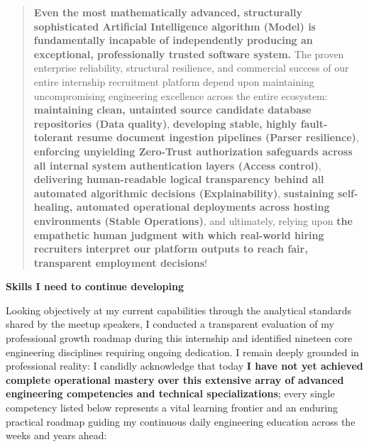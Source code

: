 \begin{quote}
\textbf{Even the most mathematically advanced, structurally
sophisticated Artificial Intelligence algorithm (Model) is fundamentally
incapable of independently producing an exceptional, professionally
trusted software system.} The proven enterprise reliability, structural
resilience, and commercial success of our entire internship recruitment
platform depend upon maintaining uncompromising engineering excellence
across the entire ecosystem: \textbf{maintaining clean, untainted source
candidate database repositories (Data quality)}, \textbf{developing
stable, highly fault-tolerant resume document ingestion pipelines
(Parser resilience)}, \textbf{enforcing unyielding Zero-Trust
authorization safeguards across all internal system authentication
layers (Access control)}, \textbf{delivering human-readable logical
transparency behind all automated algorithmic decisions
(Explainability)}, \textbf{sustaining self-healing, automated
operational deployments across hosting environments (Stable
Operations)}, and ultimately, relying upon \textbf{the empathetic human
judgment with which real-world hiring recruiters interpret our platform
outputs to reach fair, transparent employment decisions}!
\end{quote}

\vspace{0.5em}\noindent\textbf{Skills I need to continue
developing}\par

Looking objectively at my current capabilities through the analytical
standards shared by the meetup speakers, I conducted a transparent
evaluation of my professional growth roadmap during this internship and
identified nineteen core engineering disciplines requiring ongoing
dedication. I remain deeply grounded in professional reality: I candidly
acknowledge that today \textbf{I have not yet achieved complete
operational mastery over this extensive array of advanced engineering
competencies and technical specializations}; every single competency
listed below represents a vital learning frontier and an enduring
practical roadmap guiding my continuous daily engineering education
across the weeks and years ahead:

